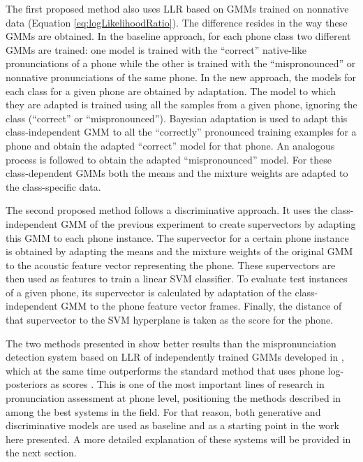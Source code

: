 The first proposed method also uses LLR based on GMMs trained
on nonnative data (Equation \ref{eq:logLikelihoodRatio}). The difference resides in the way these GMMs are obtained.
In the baseline approach, for each phone class two different GMMs are trained: one model is
trained with the ``correct'' native-like pronunciations of a phone while the other is trained
with the ``mispronounced'' or nonnative pronunciations of the same phone. In the new approach,
the models for each class for a given phone are obtained by adaptation. The model to which they
are adapted is trained using all the samples from a given phone, ignoring the class (``correct''
or ``mispronounced''). Bayesian adaptation \cite{ubm_adaptation} is used to adapt this class-independent
GMM to all the ``correctly'' pronounced training examples for a phone and obtain the adapted
``correct'' model for that phone. An analogous process is followed to obtain the adapted
``mispronounced'' model. For these class-dependent GMMs both the means and the mixture weights
are adapted to the class-specific data.

The second proposed method follows a discriminative approach. It uses the class-independent
GMM of the previous experiment to create supervectors by adapting this GMM to each phone instance.
The supervector for a certain phone instance is obtained by adapting the means and the mixture
weights of the original GMM to the acoustic feature vector representing the phone.
These supervectors are then used as features to train a linear SVM classifier.
To evaluate test instances of a given phone, its supervector is calculated by adaptation of the class-independent
GMM to the phone feature vector frames. Finally, the distance of that supervector to the SVM
hyperplane is taken as the score for the phone.

The two methods presented in \cite{main} show better results than the mispronunciation
detection system based on LLR of independently trained GMMs developed in
\cite{detection_phone_level_mispronunciation_learning}, which at the same time
outperforms the standard method that uses phone log-posteriors
as scores \cite{pronunciation_scoring_phone_segments_instruction}.
This is one of the most important lines of research in pronunciation assessment
at phone level, positioning the methods described in \cite{main} among the best
systems in the field. For that reason, both generative and discriminative models are
used as baseline and as a starting point in the work here presented. A more detailed
explanation of these systems will be provided in the next section.
